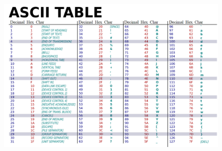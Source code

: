 \documentclass[ notitlepage, numerical, 11pt]{revtex4-1} %
\begin{document}



\begin{appendix}

\begin{figure}[H]
\centerline{\includegraphics[scale=.45]{ascii.png}}
\end{figure} 
\end{appendix}
\end{document}
